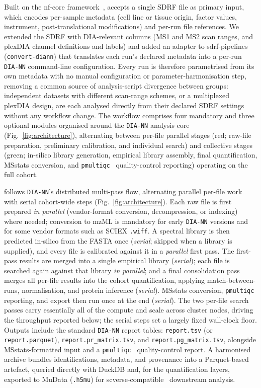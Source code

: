 \documentclass[preprint,12pt]{elsarticle}
\begin{document}
Built on the nf-core framework~\cite{ewels2020nfcore}, \quantmsdiann{} accepts a single SDRF file as primary input, which encodes per-sample metadata (cell line or tissue origin, factor values, instrument, post-translational modifications) and per-run file references. We extended the SDRF with DIA-relevant columns (MS1 and MS2 scan ranges, and plexDIA channel definitions and labels) and added an adapter to sdrf-pipelines~\cite{dai2021sdrf} (\texttt{convert-diann}) that translates each run's declared metadata into a per-run \texttt{DIA-NN} command-line configuration. Every run is therefore parametrised from its own metadata with no manual configuration or parameter-harmonisation step, removing a common source of analysis-script divergence between groups: independent datasets with different scan-range schemes, or a multiplexed plexDIA design, are each analysed directly from their declared SDRF settings without any workflow change.
The workflow comprises four mandatory and three optional modules organised around the \texttt{DIA-NN} analysis core (Fig.~\ref{fig:architecture}), alternating between per-file parallel stages (red; raw-file preparation, preliminary calibration, and individual search) and collective stages (green; in-silico library generation, empirical library assembly, final quantification, MSstats conversion, and \texttt{pmultiqc}~\cite{yue2026pmultiqc} quality-control reporting) operating on the full cohort.

\quantmsdiann{} follows \texttt{DIA-NN}'s distributed multi-pass flow, alternating parallel per-file work with serial cohort-wide steps (Fig.~\ref{fig:architecture}). Each raw file is first prepared \emph{in parallel} (vendor-format conversion, decompression, or indexing) where needed; conversion to mzML is mandatory for early \texttt{DIA-NN} versions and for some vendor formats such as SCIEX \texttt{.wiff}. A spectral library is then predicted in-silico from the FASTA once (\emph{serial}; skipped when a library is supplied), and every file is calibrated against it in a \emph{parallel} first pass. The first-pass results are merged into a single empirical library (\emph{serial}); each file is searched again against that library \emph{in parallel}; and a final consolidation pass merges all per-file results into the cohort quantification, applying match-between-runs, normalisation, and protein inference (\emph{serial}). MSstats conversion, \texttt{pmultiqc} reporting, and \qpx{} export then run once at the end (\emph{serial}). The two per-file search passes carry essentially all of the compute and scale across cluster nodes, driving the throughput reported below; the serial steps set a largely fixed wall-clock floor.
Outputs include the standard \texttt{DIA-NN} report tables: \texttt{report.tsv} (or \texttt{report.parquet}), \texttt{report.pr\_matrix.tsv}, and \texttt{report.pg\_matrix.tsv}, alongside MSstats-formatted input and a \texttt{pmultiqc}~\cite{yue2026pmultiqc} quality-control report. A harmonised \qpx{} archive bundles identifications, metadata, and provenance into a Parquet-based artefact, queried directly with DuckDB and, for the quantification layers, exported to MuData (\texttt{.h5mu}) for scverse-compatible~\cite{virshup2023scverse} downstream analysis.
\end{document}
